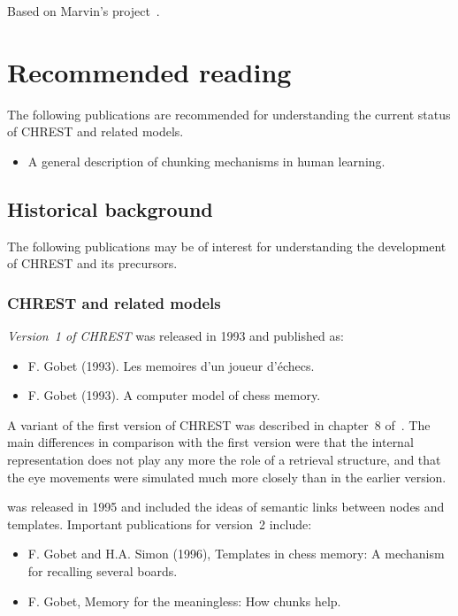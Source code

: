 \documentclass{article}
\begin{document}
Based on Marvin's project~\cite{Gobet11a}.

\section{Recommended reading}

The following publications are recommended for understanding the current 
status of CHREST and related models.

\begin{itemize}
\item A general description of chunking mechanisms in human learning.\cite{Gobet01}
\end{itemize}


\subsection{Historical background}

The following publications may be of interest for understanding the development 
of CHREST and its precursors.

\subsubsection{CHREST and related models}

{\em Version~1 of CHREST} was released in 1993 and published as:

\begin{itemize}
\item F. Gobet (1993). Les memoires d'un joueur d'\'echecs.~\cite{Gobet93a}
\item F. Gobet (1993). A computer model of chess memory.~\cite{Gobet93b}
\end{itemize}

A variant of the first version of CHREST was described in chapter~8 of~\cite{deGroot96}.
The main differences in comparison with the first version were that the
internal representation does not play any more the role of a retrieval
structure, and that the eye movements were simulated much more closely than in
the earlier version. 
\vspace{3pt}

 was released in 1995 and included the
ideas of semantic links between nodes and templates.  Important publications
for version~2 include:

\begin{itemize}
\item F. Gobet and H.A. Simon (1996), Templates in chess memory: A mechanism for 
recalling several boards.~\cite{Gobet96b}
\item F. Gobet, Memory for the meaningless: How chunks help.~\cite{Gobet98a}
\end{itemize}
\end{document}

